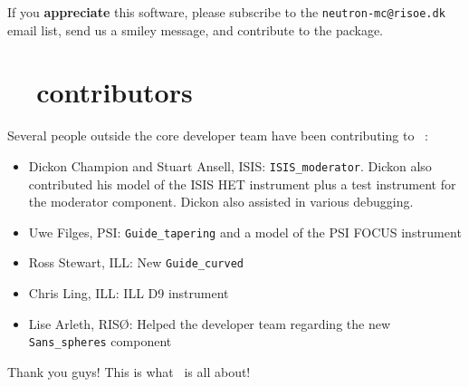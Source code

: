 If you {\bf appreciate} this software, please subscribe to the \verb+neutron-mc@risoe.dk+ email list, send us a smiley message, and contribute to the package.

\section*{\MCS\ \version\ contributors}
Several people outside the core developer team have been contributing
to \MCS\ \version:
\begin{itemize}
\item{Dickon Champion and Stuart Ansell, ISIS:
    \verb+ISIS_moderator+. Dickon also contributed his model of the
    ISIS HET instrument plus a test instrument for the moderator
    component. Dickon also assisted in various debugging.}
\item{Uwe Filges, PSI: \verb+Guide_tapering+ and a model of the PSI
    FOCUS instrument}
\item{Ross Stewart, ILL: New \verb+Guide_curved+}
\item{Chris Ling, ILL: ILL D9 instrument}
\item{Lise Arleth, RIS\O: Helped the developer team regarding the new
  \verb+Sans_spheres+ component}
\end{itemize}
Thank you guys! This is what \MCS\ is all about!


